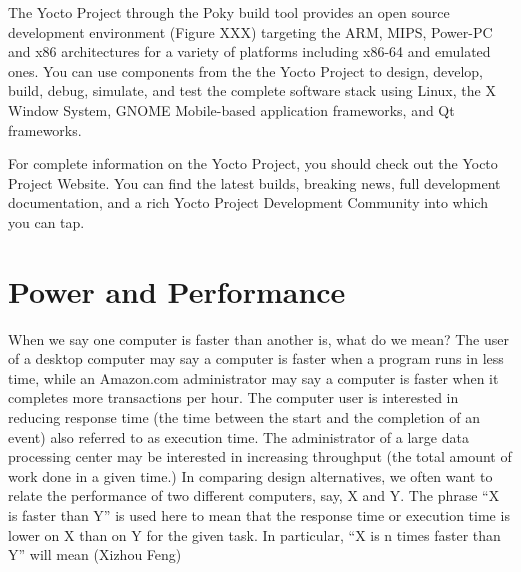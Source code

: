 The Yocto Project through the Poky build tool provides an open source
development environment (Figure XXX) targeting the ARM, MIPS, Power-PC and x86 
architectures for a variety of platforms including x86-64 and emulated ones. 
You can use components from the the Yocto Project to design, develop, build, 
debug, simulate, and test the complete software stack using Linux, the X Window
System, GNOME Mobile-based application frameworks, and Qt frameworks. 

For complete information on the Yocto Project, you should check out the Yocto
Project Website. You can find the latest builds, breaking news, full
development documentation, and a rich Yocto Project Development Community into
which you can tap.


\section{Power and Performance}

\noindent
When we say one computer is faster than another is, what do we mean? The user
of a desktop computer may say a computer is faster when a program runs in less
time, while an Amazon.com administrator may say a computer is faster when it
completes more transactions per hour. The computer user is interested in 
reducing response time (the time between the start and the completion of an 
event) also referred to as execution time. The administrator of a large data 
processing center may be interested in increasing throughput (the total amount 
of work done in a given time.) In comparing design alternatives, we often want
to relate the performance of two different computers, say, X and Y. The phrase 
“X is faster than Y” is used here to mean that the response time or execution 
time is lower on X than on Y for the given task. In particular, “X is n times 
faster than Y” will mean (Xizhou Feng)



\clearpage
